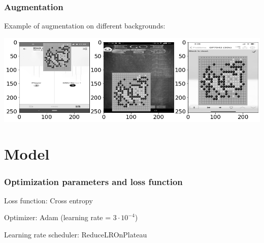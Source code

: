 \documentclass{beamer}
\begin{document}

\begin{frame}
\frametitle{Augmentation}
Example of augmentation on different backgrounds:
\begin{center}
\includegraphics[scale=0.35]{images/augmentation_wb.png}
\end{center}

\end{frame}

\section{Model}
\begin{frame}
\frametitle{Optimization parameters and loss function}

\begin{center}
Loss function: Cross entropy

Optimizer: Adam (learning rate = $3 \cdot 10^{-4}$)

Learning rate scheduler: ReduceLROnPlateau
\end{center}

\end{frame}
\end{document}
